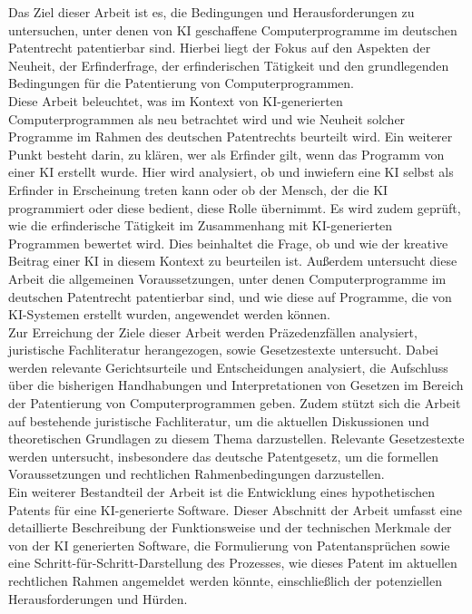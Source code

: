 Das Ziel dieser Arbeit ist es, 
die Bedingungen und Herausforderungen zu untersuchen,
unter denen von KI geschaffene Computerprogramme im deutschen Patentrecht 
patentierbar sind. Hierbei liegt der Fokus auf den Aspekten der Neuheit, 
der Erfinderfrage, der erfinderischen Tätigkeit 
und den grundlegenden Bedingungen für die Patentierung von Computerprogrammen. 
\\

Diese Arbeit beleuchtet, 
was im Kontext von KI-generierten Computerprogrammen 
als neu betrachtet wird 
und wie Neuheit solcher Programme im Rahmen des deutschen Patentrechts beurteilt wird. 
Ein weiterer Punkt besteht darin, zu klären, 
wer als Erfinder gilt,
wenn das Programm von einer KI erstellt wurde. 
Hier wird analysiert, ob und inwiefern eine KI selbst als Erfinder in Erscheinung treten kann 
oder ob der Mensch, der die KI programmiert oder diese bedient, diese Rolle übernimmt. 
Es wird zudem geprüft, 
wie die erfinderische Tätigkeit im Zusammenhang mit KI-generierten Programmen bewertet wird. 
Dies beinhaltet die Frage, ob und wie der kreative Beitrag einer KI in diesem Kontext zu beurteilen ist. 
Außerdem untersucht diese Arbeit die allgemeinen Voraussetzungen, 
unter denen Computerprogramme im deutschen Patentrecht patentierbar sind, 
und wie diese auf Programme, die von KI-Systemen erstellt wurden, angewendet werden können. 
\\

Zur Erreichung der Ziele dieser Arbeit werden Präzedenzfällen analysiert, 
juristische Fachliteratur herangezogen, sowie Gesetzestexte untersucht. 
Dabei werden relevante Gerichtsurteile und Entscheidungen analysiert, 
die Aufschluss über die bisherigen Handhabungen 
und Interpretationen von Gesetzen im Bereich der Patentierung von Computerprogrammen geben. 
Zudem stützt sich die Arbeit auf bestehende juristische Fachliteratur, 
um die aktuellen Diskussionen und theoretischen Grundlagen zu diesem Thema darzustellen. 
Relevante Gesetzestexte werden untersucht, insbesondere das deutsche Patentgesetz, 
um die formellen Voraussetzungen und rechtlichen Rahmenbedingungen darzustellen. 
\\

Ein weiterer Bestandteil der Arbeit ist die Entwicklung eines hypothetischen Patents 
für eine KI-generierte Software. 
Dieser Abschnitt der Arbeit umfasst eine detaillierte Beschreibung der Funktionsweise 
und der technischen Merkmale der von der KI generierten Software, 
die Formulierung von Patentansprüchen sowie eine Schritt-für-Schritt-Darstellung des Prozesses, 
wie dieses Patent im aktuellen rechtlichen Rahmen angemeldet werden könnte, 
einschließlich der potenziellen Herausforderungen und Hürden. 
\\

